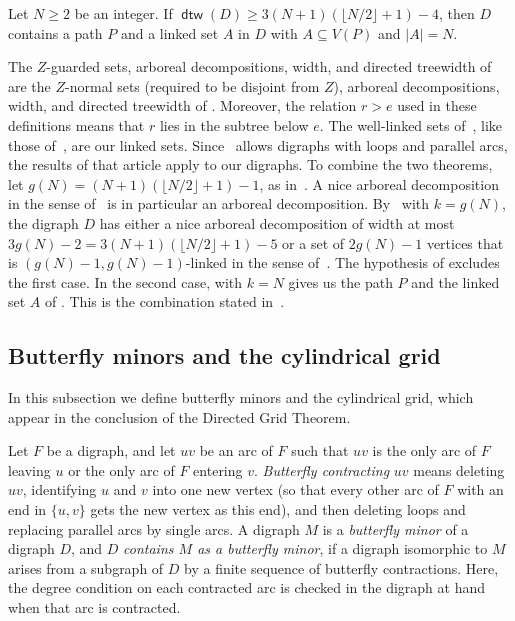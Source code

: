 \documentclass[fontsize=12pt,leading=14pt]{fullpaper}
\DeclareMathOperator{\dtw}{\mathsf{dtw}}
\begin{document}
\begin{proposition}\label{prop:linked-path}
  Let $N\ge2$ be an integer.
  If $\dtw(D)\ge3(N+1)(\lfloor N/2\rfloor+1)-4$, then $D$ contains a path $P$ and a linked set $A$ in $D$ with $A\subseteq V(P)$ and $|A|=N$.
\end{proposition}

\begin{remark}\label{rem:clms}
  The $Z$-guarded sets, arboreal decompositions, width, and directed treewidth of~\cite[definitions~2.2, 2.3 and~2.5]{CLMS22} are the $Z$-normal sets (required to be disjoint from $Z$), arboreal decompositions, width, and directed treewidth of .
  Moreover, the relation $r>e$ used in these definitions means that $r$ lies in the subtree below $e$.
  The well-linked sets of~\cite[Definition~2.8]{CLMS22}, like those of~\cite[Definition~3.4]{CLNS26}, are our linked sets.
  Since~\cite[Section~2.1]{CLMS22} allows digraphs with loops and parallel arcs, the results of that article apply to our digraphs.
  To combine the two theorems, let $g(N)=(N+1)(\lfloor N/2\rfloor+1)-1$, as in~\cite[Theorem~2.23]{CLMS22}.
  A nice arboreal decomposition in the sense of~\cite[Definition~2.4]{CLMS22} is in particular an arboreal decomposition.
  By~\cite[Theorem~2.17]{CLMS22} with $k=g(N)$, the digraph $D$ has either a nice arboreal decomposition of width at most $3g(N)-2=3(N+1)(\lfloor N/2\rfloor+1)-5$ or a set of $2g(N)-1$ vertices that is $(g(N)-1,g(N)-1)$-linked in the sense of~\cite[Definition~2.16]{CLMS22}.
  The hypothesis of  excludes the first case.
  In the second case, \cite[Theorem~2.23]{CLMS22} with $k=N$ gives us the path $P$ and the linked set $A$ of .
  This is the combination stated in~\cite[Proposition~3.5]{CLNS26}.
\end{remark}
\subsection{Butterfly minors and the cylindrical grid}\label{sec:prelim-grid}

In this subsection we define butterfly minors and the cylindrical grid, which appear in the conclusion of the Directed Grid Theorem.

\begin{definition}\label{def:butterfly}
  Let $F$ be a digraph, and let $uv$ be an arc of $F$ such that $uv$ is the only arc of $F$ leaving $u$ or the only arc of $F$ entering $v$.
  \emph{Butterfly contracting} $uv$ means deleting $uv$, identifying $u$ and $v$ into one new vertex (so that every other arc of $F$ with an end in $\{u,v\}$ gets the new vertex as this end), and then deleting loops and replacing parallel arcs by single arcs.
  A digraph $M$ is a \emph{butterfly minor} of a digraph $D$, and $D$ \emph{contains $M$ as a butterfly minor}, if a digraph isomorphic to $M$ arises from a subgraph of $D$ by a finite sequence of butterfly contractions.
  Here, the degree condition on each contracted arc is checked in the digraph at hand when that arc is contracted.
\end{definition}
\end{document}
